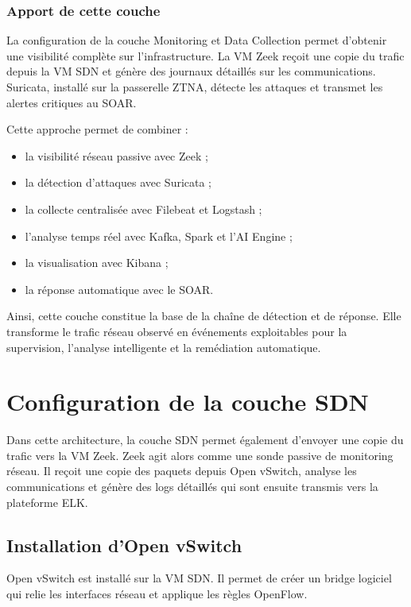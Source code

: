\documentclass[12pt,a4paper,oneside]{report}
\begin{document}
	\subsubsection{Apport de cette couche}
	
	La configuration de la couche Monitoring et Data Collection permet d'obtenir une visibilité complète sur l'infrastructure. La VM Zeek reçoit une copie du trafic depuis la VM SDN et génère des journaux détaillés sur les communications. Suricata, installé sur la passerelle ZTNA, détecte les attaques et transmet les alertes critiques au SOAR.
	
	Cette approche permet de combiner :
	
	\begin{itemize}
		\item la visibilité réseau passive avec Zeek ;
		\item la détection d'attaques avec Suricata ;
		\item la collecte centralisée avec Filebeat et Logstash ;
		\item l'analyse temps réel avec Kafka, Spark et l'AI Engine ;
		\item la visualisation avec Kibana ;
		\item la réponse automatique avec le SOAR.
	\end{itemize}
	
	Ainsi, cette couche constitue la base de la chaîne de détection et de réponse. Elle transforme le trafic réseau observé en événements exploitables pour la supervision, l'analyse intelligente et la remédiation automatique.
	\section{Configuration de la couche SDN}
	Dans cette architecture, la couche SDN permet également d'envoyer une copie du trafic vers la VM Zeek. Zeek agit alors comme une sonde passive de monitoring réseau. Il reçoit une copie des paquets depuis Open vSwitch, analyse les communications et génère des logs détaillés qui sont ensuite transmis vers la plateforme ELK.
	

	
	\subsection{Installation d'Open vSwitch}
	
	Open vSwitch est installé sur la VM SDN. Il permet de créer un bridge logiciel qui relie les interfaces réseau et applique les règles OpenFlow.
	
\end{document}
